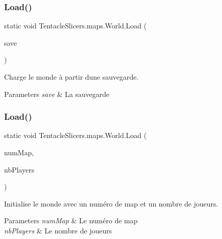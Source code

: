 \subsubsection{\texorpdfstring{Load()}{Load()}\hspace{0.1cm}{\footnotesize\ttfamily [1/2]}}
{\footnotesize\ttfamily static void Tentacle\+Slicers.\+maps.\+World.\+Load (\begin{DoxyParamCaption}\item[{\hyperlink{class_tentacle_slicers_1_1maps_1_1_game_save}{Game\+Save}}]{save }\end{DoxyParamCaption})\hspace{0.3cm}{\ttfamily [static]}}



Charge le monde à partir d\textquotesingle{}une sauvegarde. 


\begin{DoxyParams}{Parameters}
{\em save} & La sauvegarde \\
\hline
\end{DoxyParams}
\mbox{\label{class_tentacle_slicers_1_1maps_1_1_world_acf0958d5895361adbbeada432516abff}} 
\subsubsection{\texorpdfstring{Load()}{Load()}\hspace{0.1cm}{\footnotesize\ttfamily [2/2]}}
{\footnotesize\ttfamily static void Tentacle\+Slicers.\+maps.\+World.\+Load (\begin{DoxyParamCaption}\item[{int}]{num\+Map,  }\item[{int}]{nb\+Players }\end{DoxyParamCaption})\hspace{0.3cm}{\ttfamily [static]}}



Initialise le monde avec un numéro de map et un nombre de joueurs. 


\begin{DoxyParams}{Parameters}
{\em num\+Map} & Le numéro de map \\
\hline
{\em nb\+Players} & Le nombre de joueurs \\
\hline
\end{DoxyParams}
\mbox{\label{class_tentacle_slicers_1_1maps_1_1_world_a43f29da91277b7a270c294d9dba6e2c7}} 
